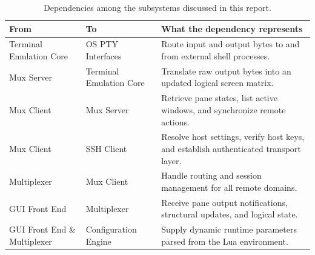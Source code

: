 \begin{table}[!htbp]
  \centering
  \caption{Dependencies among the subsystems discussed in this report.}
  \label{tab:dependencies}
  \begin{tabularx}{\linewidth}{@{}llX@{}}
    \toprule
    \textbf{From} & \textbf{To} & \textbf{What the dependency represents} \\
    \midrule
    Terminal Emulation Core & OS PTY Interfaces & Route input and output bytes to and from external shell processes. \\
    Mux Server & Terminal Emulation Core & Translate raw output bytes into an updated logical screen matrix. \\
    Mux Client & Mux Server & Retrieve pane states, list active windows, and synchronize remote actions. \\
    Mux Client & SSH Client & Resolve host settings, verify host keys, and establish authenticated transport layer. \\
    Multiplexer & Mux Client & Handle routing and session management for all remote domains. \\
    GUI Front End & Multiplexer & Receive pane output notifications, structural updates, and logical state. \\
    GUI Front End \& Multiplexer & Configuration Engine & Supply dynamic runtime parameters parsed from the Lua environment. \\
    \bottomrule
  \end{tabularx}
\end{table}
